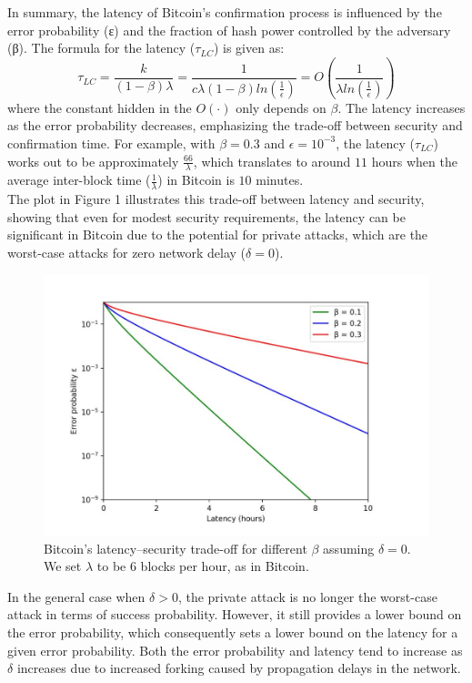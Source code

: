 In summary, the latency of Bitcoin's confirmation process is influenced by the error probability (ε) and the fraction of hash power controlled by the adversary (β). The formula for the latency ($\tau_{LC}$) is given as:
\begin{equation*}
	\tau_{LC} = \frac{k}{(1 - \beta)\lambda } = \frac{1}{c \lambda (1 - \beta) ln(\frac{1}{\epsilon})} = O(\frac{1}{\lambda ln(\frac{1}{\epsilon})})
\end{equation*}
where the constant hidden in the $O(·)$ only depends on $\beta$. The latency increases as the error probability decreases, emphasizing the trade-off between security and confirmation time.
For example, with $\beta = 0.3$ and $\epsilon = 10^{-3}$, the latency ($\tau_{LC}$) works out to be approximately $\frac{66}{\lambda}$, which translates to around $11$ hours when the average inter-block time ($\frac{1}{\lambda}$) in Bitcoin is $10$ minutes.\\
The plot in Figure 1 illustrates this trade-off between latency and security, showing that even for modest security requirements, the latency can be significant in Bitcoin due to the potential for private attacks, which are the worst-case attacks for zero network delay ($\delta = 0$).
\begin{center}
	\begin{figure}
		\centering
		\includegraphics[width=0.8\linewidth]{Fig/09/F1}
		\caption{Bitcoin’s latency–security trade-oﬀ for diﬀerent $\beta$ assuming $\delta = 0$. We set $\lambda$ to be $6$ blocks per hour, as in Bitcoin.}
		\label{fig:f1}
	\end{figure}
\end{center}
In the general case when $\delta > 0$, the private attack is no longer the worst-case attack in terms of success probability. However, it still provides a lower bound on the error probability, which consequently sets a lower bound on the latency for a given error probability. Both the error probability and latency tend to increase as $\delta$ increases due to increased forking caused by propagation delays in the network.\\
